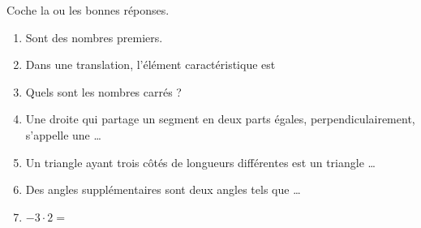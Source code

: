 %
%
    Coche la ou les bonnes réponses.
    \begin{enumerate}
        \item Sont des nombres premiers.
        \item Dans une translation, l'élément caractéristique est
        \item Quels sont les nombres carrés ?
        \item Une droite qui partage un segment en deux parts égales, perpendiculairement, s'appelle une \dots
        \item Un triangle ayant trois côtés de longueurs différentes est un triangle \dots
        \item Des angles supplémentaires sont deux angles tels que \dots
        \item \(-3 \cdot 2 =\)
    \end{enumerate}
